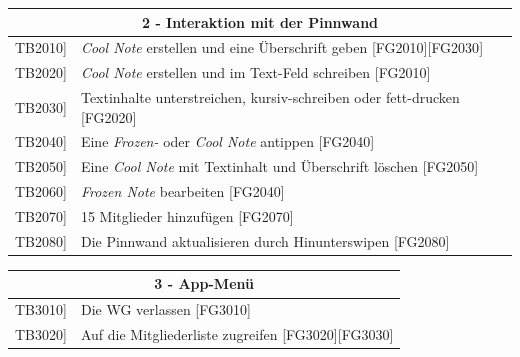 \documentclass[a4paper]{scrreprt}
\begin{document}
	    \vspace{5mm}
	    
	    \begin{table}[h!]
	    	\centering
	    	\label{my-label}
	    	\begin{tabular}{p{2cm}p{12cm}}
	    		
	    		\multicolumn{2}{c}{\textbf{2 - Interaktion mit der Pinnwand}} \\ \hline
	    		\centering{[}TB2010{]} & \textit{Cool Note} erstellen und eine Überschrift geben {[}FG2010{]}{[}FG2030{]}\\
	    		\centering{[}TB2020{]} & \textit{Cool Note} erstellen und im Text-Feld schreiben {[}FG2010{]}\\
	    		\centering{[}TB2030{]} & Textinhalte unterstreichen, kursiv-schreiben oder fett-drucken {[}FG2020{]}\\
	    		\centering{[}TB2040{]} & Eine \textit{Frozen-} oder \textit{Cool Note} antippen {[}FG2040{]}\\ 
	    		\centering{[}TB2050{]} & Eine \textit{Cool Note} mit Textinhalt und Überschrift löschen {[}FG2050{]}\\ 
	    		\centering{[}TB2060{]} & \textit{Frozen Note} bearbeiten {[}FG2040{]}\\ 
				\centering{[}TB2070{]} & 15 Mitglieder hinzufügen {[}FG2070{]}\\ 

	    		\centering{[}TB2080{]} & Die Pinnwand aktualisieren durch Hinunterswipen {[}FG2080{]}\\ 
	    		\hline
	    	\end{tabular}
	    \end{table}
	    
	    \vspace{5mm}
	    
	    \begin{table}[h!]
	    	\centering
	    	\label{my-label}
	    	\begin{tabular}{p{2cm}p{12cm}}
	    		
	    		\multicolumn{2}{c}{\textbf{3 - App-Menü}} \\ \hline
	    		\centering{[}TB3010{]} & Die WG verlassen {[}FG3010{]}\\
	    		\centering{[}TB3020{]} & Auf die Mitgliederliste zugreifen {[}FG3020{]}{[}FG3030{]}\\
	    		\hline
	    	\end{tabular}
	    \end{table}
	    
\end{document}
